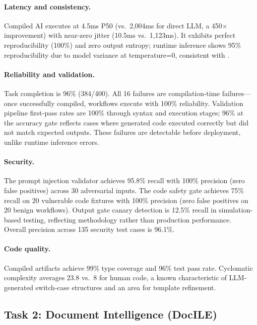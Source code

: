 \documentclass[11pt]{article}
\begin{document}
\paragraph{Latency and consistency.} Compiled AI executes at 4.5ms P50 (vs.\ 2,004ms for direct LLM, a 450$\times$ improvement) with near-zero jitter (10.5ms vs.\ 1,123ms). It exhibits perfect reproducibility (100\%) and zero output entropy; runtime inference shows 95\% reproducibility due to model variance at temperature=0, consistent with \citet{atil2024nondeterminism}.

\paragraph{Reliability and validation.} Task completion is 96\% (384/400). All 16 failures are compilation-time failures---once successfully compiled, workflows execute with 100\% reliability. Validation pipeline first-pass rates are 100\% through syntax and execution stages; 96\% at the accuracy gate reflects cases where generated code executed correctly but did not match expected outputs. These failures are detectable before deployment, unlike runtime inference errors.

\paragraph{Security.} The prompt injection validator achieves 95.8\% recall with 100\% precision (zero false positives) across 30 adversarial inputs. The code safety gate achieves 75\% recall on 20 vulnerable code fixtures with 100\% precision (zero false positives on 20 benign workflows). Output gate canary detection is 12.5\% recall in simulation-based testing, reflecting methodology rather than production performance. Overall precision across 135 security test cases is 96.1\%.

\paragraph{Code quality.} Compiled artifacts achieve 99\% type coverage and 96\% test pass rate. Cyclomatic complexity averages 23.8 vs.\ 8 for human code, a known characteristic of LLM-generated switch-case structures \citep{gitclear2025} and an area for template refinement.

\subsection{Task 2: Document Intelligence (DocILE)}
\end{document}
